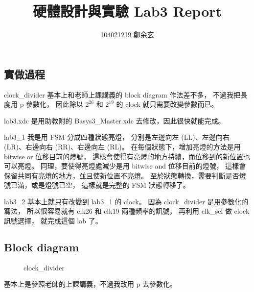 \documentclass{article}
\begin{document}
\begin{CJK}{UTF8}{bsmi}
\title{硬體設計與實驗 Lab3 Report}
\author{
104021219 鄭余玄
}
\date{}
\maketitle
\section{實做過程}
clock\_divider 基本上和老師上課講義的 block diagram 作法差不多，
不過我把長度用 p 參數化，
因此除以 $2^{26}$ 和 $2^{19}$ 的 clock 就只需要改變參數而已。

lab3.xdc 是用助教附的 Basys3\_Master.xdc 去修改，因此很快就能完成。

lab3\_1 我是用 FSM 分成四種狀態亮燈，
分別是左邊向左 (LL)、左邊向右 (LR)、右邊向右 (RR)、右邊向左 (RL)。
在每個狀態下，增加亮燈的方法是用 bitwise or 位移目前的燈號，
這樣會使得有亮燈的地方持續，而位移到的新位置也可以亮燈。
同理，要使得亮燈處減少是用 bitwise and 位移目前的燈號，
這樣會保留共同有亮燈的地方，並且使新位置不亮燈。
至於狀態轉換，需要判斷是否燈號已滿，或是燈號已空，
這樣就是完整的 FSM 狀態轉移了。

lab3\_2 基本上就只有改變到 lab3\_1 的 clock。
因為 clock\_divider 是用參數化的寫法，
所以很容易就有 clk26 和 clk19 兩種頻率的訊號，
再利用 clk\_sel 做 clock 訊號選擇，
就完成這個 lab 了。
\subsection{Block diagram}
\begin{figure}[h]
\caption{clock\_divider}
\end{figure}
基本上是參照老師的上課講義，不過我改用 p 去參數化。

\end{CJK}
\end{document}
